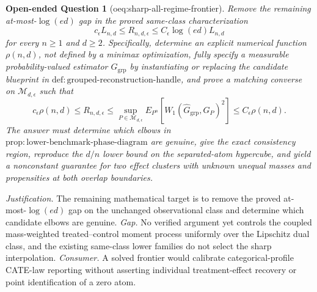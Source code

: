 \documentclass{article}
\newtheorem{openendedquestion}{Open-ended Question}
\begin{document}
\begin{openendedquestion}[oeq:sharp-all-regime-frontier]\label{oeq:sharp-all-regime-frontier}
Remove the remaining at-most-\(\log(ed)\) gap in the proved same-class characterization
\[
 c_\epsilon L_{n,d}\leq R_{n,d,\epsilon}
 \leq C_\epsilon\log(ed)L_{n,d}
\]
for every \(n\geq1\) and \(d\geq2\).  Specifically, determine an explicit numerical function \(\rho(n,d)\), not defined by a minimax optimization, fully specify a measurable probability-valued estimator \(\widehat G_{\mathrm{grp}}\) by instantiating or replacing the candidate blueprint in \(\mathrm{def:grouped\mbox{-}reconstruction\mbox{-}handle}\), and prove a matching converse on \(\mathcal M_{d,\epsilon}\) such that
\[
 c_\epsilon\rho(n,d)\leq R_{n,d,\epsilon}
 \leq \sup_{P\in\mathcal M_{d,\epsilon}}
 E_{P^n}\!\left[W_1(\widehat G_{\mathrm{grp}},G_P)^2\right]
 \leq C_\epsilon\rho(n,d).
\]
The answer must determine which elbows in \(\mathrm{prop:lower\mbox{-}benchmark\mbox{-}phase\mbox{-}diagram}\) are genuine, give the exact consistency region, reproduce the \(d/n\) lower bound on the separated-atom hypercube, and yield a nonconstant guarantee for two effect clusters with unknown unequal masses and propensities at both overlap boundaries.
\end{openendedquestion}
\par\smallskip\noindent \textit{Justification.} The remaining mathematical target is to remove the proved at-most-\(\log(ed)\) gap on the unchanged observational class and determine which candidate elbows are genuine. \textit{Gap.} No verified argument yet controls the coupled mass-weighted treated--control moment process uniformly over the Lipschitz dual class, and the existing same-class lower families do not select the sharp interpolation. \textit{Consumer.} A solved frontier would calibrate categorical-profile CATE-law reporting without asserting individual treatment-effect recovery or point identification of a zero atom.
\end{document}
